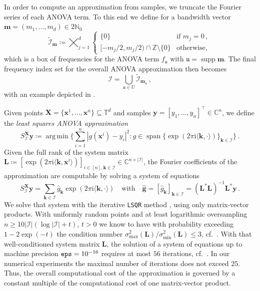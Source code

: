 \documentclass[a4paper]{scrartcl}
\numberwithin{equation}{section}
\renewcommand{\tilde}{\widetilde}
\DeclareMathOperator{\Span}{span}
\DeclareMathOperator{\Supp}{supp}
\DeclareMathOperator{\Argmin}{arg\,min}
\begin{document}
In order to compute an approximation from samples, we truncate the Fourier series of each ANOVA term.
To this end we define for a bandwidth vector $\bm m = (m_1, \dots, m_d)\in 2\mathds N_0$
\begin{equation}\label{eq:anovafreqs1}
    \tilde{\mathcal I}_{\bm m}
    \coloneqq
    \bigtimes_{j=1}^{d} 
    \begin{cases}
        \{0\} & \text{if } m_j=0 \,, \\
        [-m_j/2, m_j/2) \cap \mathds Z \setminus \{0\} & \text{otherwise,} \phantom]
    \end{cases}
\end{equation}
which is a box of frequencies for the ANOVA term $f_{\mathfrak u}$ with $\mathfrak u = \Supp\bm m$.
The final frequency index set for the overall ANOVA approximation then becomes
\begin{equation}\label{eq:anovafreqs2}
    \mathcal I = \bigcup_{\mathfrak u\in U} \tilde{\mathcal I}_{\bm m_{\mathfrak u}} \,,
\end{equation}
with an example depicted in .

Given points $\bm X = \{\bm x^1, \dots, \bm x^n\}\subseteq\mathds T^d$ and samples $\bm y = [y_1,\dots,y_n]^\top\in\mathds C^n$, we define the \emph{least squares ANOVA approximation}
\begin{equation}\label{eq:lsqr}
    S_{\mathcal I}^{\bm X} \bm y
    \coloneqq \Argmin\Big\{
        \sum_{i=1}^{n} |g(\bm x^i)-y_i|^2 :
        g\in\Span\{\exp(2\pi\mathrm i\langle\bm k,\cdot\rangle)\}_{\bm k\in\mathcal I}
    \Big\} \,.
\end{equation}
Given the full rank of the system matrix $\bm L \coloneqq [ \exp(2\pi\mathrm i\langle\bm k,\bm x^i\rangle) ]_{i\in [n], \bm k\in \mathcal I} \in\mathds C^{n\times|\mathcal I|}$, the Fourier coefficients of the approximation are computable by solving a system of equations
\begin{equation*}
    S_{\mathcal I}^{\bm X}\bm y = \sum_{\bm k\in\mathcal I} \hat g_{\bm k}\exp(2\pi\mathrm i\langle\bm k,\cdot\rangle)
    \quad\text{with}\quad
    \bm{\hat g}
    = [\hat g_{\bm k}]_{\bm k\in\mathcal I}
    = (\bm L^\ast\bm L)^{-1}\bm L^\ast\bm y \,.
\end{equation*}
We solve that system with the iterative \texttt{LSQR} method \cite{PS82}, using only matrix-vector products.
With uniformly random points and at least logarithmic oversampling $n\ge 10 |\mathcal I|(\log|\mathcal I|+t)$, $t>0$ we know to have with probability exceeding $1-2\exp(-t)$ the condition number $\sigma_{\max}^2(\bm L)/\sigma_{\min}^2(\bm L) \le 3$, cf.~\cite[Lemmata~6.2 and 6.4]{Barteldiss}.
With that well-conditioned system matrix $\bm L$, the solution of a system of equations up to machine precision $\text{\texttt{eps}} = 10^{-16}$ requires at most $56$ iterations, cf.~\cite[Theorem~3.1.1]{Gre97}.
In our numerical experiments the maximal number of iterations does not exceed $25$.
Thus, the overall computational cost of the approximation is governed by a constant multiple of the computational cost of one matrix-vector product.
\end{document}
